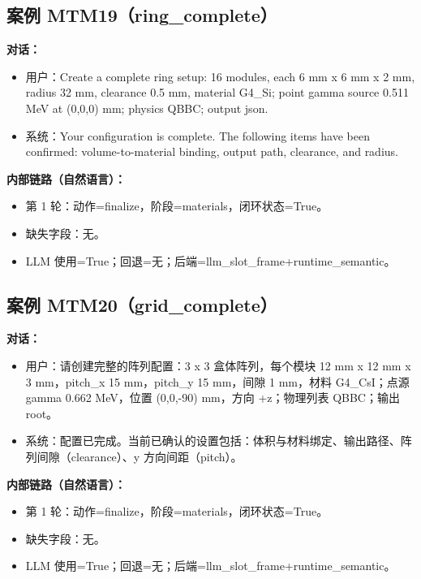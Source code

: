\documentclass[11pt]{ctexart}
\begin{document}
\subsection{案例 MTM19（ring\_complete）}
\textbf{对话：}
\begin{itemize}
\item 用户：Create a complete ring setup: 16 modules, each 6 mm x 6 mm x 2 mm, radius 32 mm, clearance 0.5 mm, material G4\_Si; point gamma source 0.511 MeV at (0,0,0) mm; physics QBBC; output json.
\item 系统：Your configuration is complete. The following items have been confirmed: volume-to-material binding, output path, clearance, and radius.
\end{itemize}
\textbf{内部链路（自然语言）：}
\begin{itemize}
\item 第 1 轮：动作=finalize，阶段=materials，闭环状态=True。
\item 缺失字段：无。
\item LLM 使用=True；回退=无；后端=llm\_slot\_frame+runtime\_semantic。
\end{itemize}
\subsection{案例 MTM20（grid\_complete）}
\textbf{对话：}
\begin{itemize}
\item 用户：请创建完整的阵列配置：3 x 3 盒体阵列，每个模块 12 mm x 12 mm x 3 mm，pitch\_x 15 mm，pitch\_y 15 mm，间隙 1 mm，材料 G4\_CsI；点源 gamma 0.662 MeV，位置 (0,0,-90) mm，方向 +z；物理列表 QBBC；输出 root。
\item 系统：配置已完成。当前已确认的设置包括：体积与材料绑定、输出路径、阵列间隙（clearance）、y 方向间距（pitch）。
\end{itemize}
\textbf{内部链路（自然语言）：}
\begin{itemize}
\item 第 1 轮：动作=finalize，阶段=materials，闭环状态=True。
\item 缺失字段：无。
\item LLM 使用=True；回退=无；后端=llm\_slot\_frame+runtime\_semantic。
\end{itemize}
\end{document}
